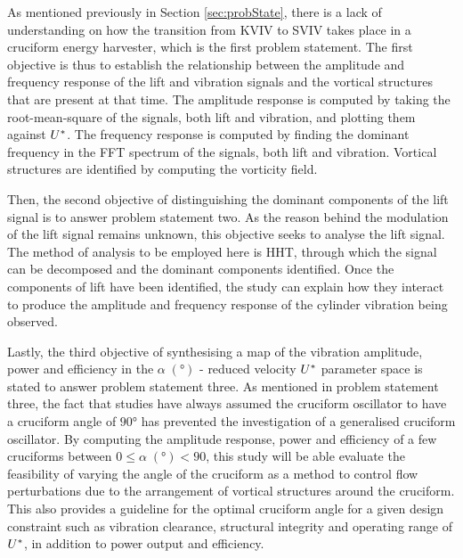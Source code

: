 \documentclass[oneside]{utmthesis}
\begin{document}
As mentioned previously in Section \ref{sec:probState}, there is a lack of understanding on how the transition from KVIV to SVIV takes place in a cruciform energy harvester, which is the first problem statement. The first objective is thus to establish the relationship between the amplitude and frequency response of the lift and vibration signals and the vortical structures that are present at that time. The amplitude response is computed by taking the root-mean-square of the signals, both lift and vibration, and plotting them against $U^{*}$. The frequency response is computed by finding the dominant frequency in the FFT spectrum of the signals, both lift and vibration. Vortical structures are identified by computing the vorticity field.

Then, the second objective of distinguishing the dominant components of the lift signal is to answer problem statement two. As the reason behind the modulation of the lift signal remains unknown, this objective seeks to analyse the lift signal. The method of analysis to be employed here is HHT, through which the signal can be decomposed and the dominant components identified. Once the components of lift have been identified, the study can explain how they interact to produce the amplitude and frequency response of the cylinder vibration being observed.

Lastly, the third objective of synthesising a map of the vibration amplitude, power and efficiency in the $\alpha \; (\si{\degree})$ - reduced velocity $U^{*}$ parameter space is stated to answer problem statement three. As mentioned in problem statement three, the fact that studies have always assumed the cruciform oscillator to have a cruciform angle of $90 \si{\degree}$ has prevented the investigation of a generalised cruciform oscillator. By computing the amplitude response, power and efficiency of a few cruciforms between $0 \leq \alpha \; (\si{\degree}) < 90$, this study will be able evaluate the feasibility of varying the angle of the cruciform as a method to control flow perturbations due to the arrangement of vortical structures around the cruciform. This also provides a guideline for the optimal cruciform angle for a given design constraint such as vibration clearance, structural integrity and operating range of $U^{*}$, in addition to power output and efficiency.
\end{document}
